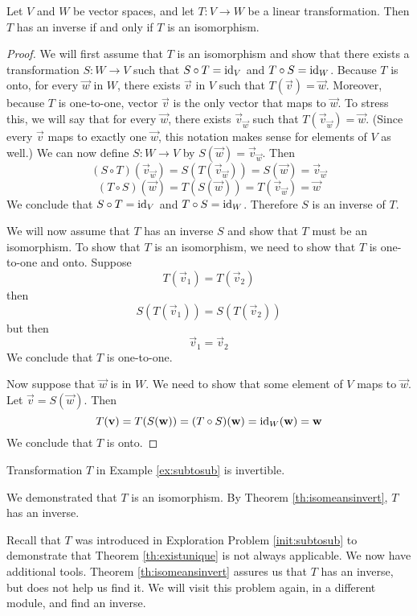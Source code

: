 \documentclass{ximera}
\begin{document}
\begin{theorem}\label{th:isomeansinvert} Let $V$ and $W$ be vector spaces, and let $T:V\rightarrow W$ be a linear transformation.  Then $T$ has an inverse if and only if $T$ is an isomorphism. 
\end{theorem}
\begin{proof}
We will first assume that $T$ is an isomorphism and show that there exists a transformation $S:W\rightarrow V$ such that $S\circ T=\text{id}_V$ and $T\circ S=\text{id}_W$.  Because $T$ is onto, for every $\vec{w}$ in $W$, there exists $\vec{v}$ in $V$ such that $T(\vec{v})=\vec{w}$.  Moreover, because $T$ is one-to-one, vector $\vec{v}$ is the only vector that maps to $\vec{w}$.  To stress this, we will say that for every $\vec{w}$, there exists $\vec{v}_{\vec{w}}$ such that $T(\vec{v}_{\vec{w}})=\vec{w}$. (Since every $\vec{v}$ maps to exactly one $\vec{w}$, this notation makes sense for elements of $V$ as well.)  We can now define $S:W\rightarrow V$ by $S(\vec{w})=\vec{v}_{\vec{w}}$.
Then
$$(S\circ T)(\vec{v}_{\vec{w}})=S(T(\vec{v}_{\vec{w}}))=S(\vec{w})=\vec{v}_{\vec{w}}$$
$$(T\circ S)(\vec{w})=T(S(\vec{w}))=T(\vec{v}_{\vec{w}})=\vec{w}$$
We conclude that $S\circ T=\text{id}_V$ and $T\circ S=\text{id}_W$.  Therefore $S$ is an inverse of $T$.

We will now assume that $T$ has an inverse $S$ and show that $T$ must be an isomorphism.  To show that $T$ is an isomorphism, we need to show that $T$ is one-to-one and onto.
Suppose $$T(\vec{v}_1)=T(\vec{v}_2)$$ then $$S(T(\vec{v}_1))=S(T(\vec{v}_2))$$
but then
$$\vec{v}_1=\vec{v}_2$$
We conclude that $T$ is one-to-one.

Now suppose that $\vec{w}$ is in $W$.  We need to show that some element of $V$ maps to $\vec{w}$.  Let $\vec{v}=S(\vec{w})$.  Then
$$T({\bf v})=T(S({\bf w}))=(T\circ S)({\bf w})=\text{id}_W({\bf w})={\bf w}$$
We conclude that $T$ is onto.
\end{proof}

\begin{example}
Transformation $T$ in Example \ref{ex:subtosub} is invertible.
\begin{explanation}
We demonstrated that $T$ is an isomorphism.  By Theorem \ref{th:isomeansinvert}, $T$ has an inverse.  

Recall that $T$ was introduced in Exploration Problem \ref {init:subtosub} to demonstrate that Theorem \ref{th:existunique} is not always applicable.  We now have additional tools. Theorem \ref{th:isomeansinvert} assures us that $T$ has an inverse, but does not help us find it. We will visit this problem again, in a different module, and find an inverse.
\end{explanation}
\end{example}
\end{document}
